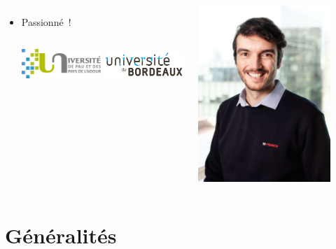 \documentclass{beamer}
\begin{document}
\begin{frame}
\begin{columns}
\begin{itemize}
                \item Passionné~!
                \bigbreak
                \begin{columns}
                    \centering
                    \includegraphics[width=3cm]{image/logo-uppa}
                    \centering
                    \includegraphics[width=3cm]{image/logo-universite-bordeaux}
                \end{columns}
            \end{itemize}
            \centering
            \includegraphics[width=5cm]{image/trombine-christophe}
        \end{columns}
    \end{frame}


    \section{Généralités}\label{sec:generalites}
\end{document}
